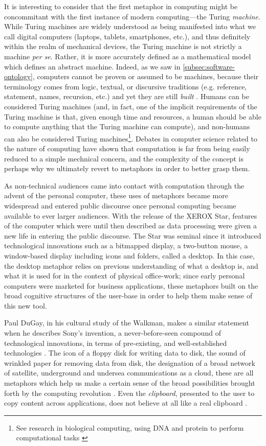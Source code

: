 It is interesting to consider that the first metaphor in computing might be concommitant with the first instance of modern computing—the Turing \emph{machine}. While Turing machines are widely understood as being manifested into what we call digital computers (laptops, tablets, smartphones, etc.), and thus definitely within the realm of mechanical devices, the Turing machine is not strictly a machine \emph{per se}. Rather, it is more accurately defined as a mathematical model which defines an abstract machine. Indeed, as we saw in \ref{subsec:software-ontology}, computers cannot be proven or assumed to be machines, because their terminology comes from logic, textual, or discursive traditions (e.g. reference, statement, names, recursion, etc.) and yet they are still \emph{built} \citep{smith_origin_1998}. Humans can be considered Turing machines (and, in fact, one of the implicit requirements of the Turing machine is that, given enough time and resources, a human should be able to compute anything that the Turing machine can compute), and non-humans can also be considered Turing machines\footnote{See research in biological computing, using DNA and protein to perform computational tasks \citep{garfinkel_biological_2000}}. Debates in computer science related to the nature of computing \citep{rapaport_philosophy_2005} have shown that computation is far from being easily reduced to a simple mechnical concern, and the complexity of the concept is perhaps why we ultimately revert to metaphors in order to better grasp them.

As non-technical audiences came into contact with computation through the advent of the personal computer, these uses of metaphors became more widespread and entered public discourse once personal computing became available to ever larger audiences. With the release of the XEROX Star, features of the computer which were until then described as data processing were given a new life in entering the public discourse. The Star was seminal since it introduced technological innovations such as a bitmapped display, a two-button mouse, a window-based display including icons and folders, called a desktop. In this case, the desktop metaphor relies on previous understanding of what a desktop is, and what it is used for in the context of physical office-work; since early personal computers were marketed for business applications, these metaphors built on the broad cognitive structures of the user-base in order to help them make sense of this new tool.

Paul DuGay, in his cultural study of the Walkman, makes a similar statement when he describes Sony's invention, a never-before-seen compound of technological innovations, in terms of pre-existing, and well-established technologies \citep{gay_doing_2013}. The icon of a floppy disk for writing data to disk, the sound of wrinkled paper for removing data from disk, the designation of a broad network of satellite, underground and undersea communications as a cloud, these are all metaphors which help us make a certain sense of the broad possibilities brought forth by the computing revolution \citep{wyatt_danger_2004}. Even the \emph{clipboard}, presented to the user to copy content across applications, does not believe at all like a real clipboard \citep{barrera_how_2022}.

